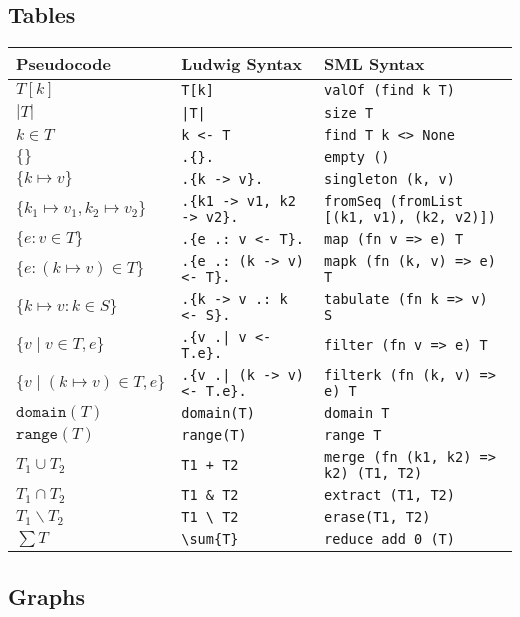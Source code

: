 \documentclass[11pt]{article}
\begin{document}
\subsection{Tables}

\begin{tabular}{| l l l |}
\hline
\textbf{Pseudocode} & \textbf{Ludwig Syntax} & \textbf{SML Syntax}\\
\hline
$T[k]$ & \verb"T[k]" & \verb"valOf (find k T)"\\
$|T|$ & \verb"|T|" & \verb"size T"\\
$k \in T$ & \verb"k <- T" & \verb"find T k <> None"\\
$\{\}$ & \verb".{}." & \verb"empty ()"\\
$\{k \mapsto v\}$ & \verb".{k -> v}." & \verb"singleton (k, v)"\\
$\{k_1 \mapsto v_1, k_2 \mapsto v_2\}$ & \verb".{k1 -> v1, k2 -> v2}." & \verb"fromSeq (fromList [(k1, v1), (k2, v2)])"\\
$\{e : v \in T\}$ & \verb".{e .: v <- T}." & \verb"map (fn v => e) T"\\
$\{e : (k \mapsto v) \in T\}$ & \verb".{e .: (k -> v) <- T}." & \verb"mapk (fn (k, v) => e) T"\\
$\{k \mapsto v : k \in S\}$ & \verb".{k -> v .: k <- S}." & \verb"tabulate (fn k => v) S"\\
$\{v \mid v \in T, e\}$ & \verb".{v .| v <- T.e}." & \verb"filter (fn v => e) T"\\
$\{v \mid (k \mapsto v) \in T, e\}$ & \verb".{v .| (k -> v) <- T.e}." & \verb"filterk (fn (k, v) => e) T"\\
$\texttt{domain}(T)$ & \verb"domain(T)" & \verb"domain T"\\
$\texttt{range}(T)$ & \verb"range(T)" & \verb"range T"\\
$T_1 \cup T_2$ & \verb"T1 + T2" & \verb"merge (fn (k1, k2) => k2) (T1, T2)"\\
$T_1 \cap T_2$ & \verb"T1 & T2" & \verb"extract (T1, T2)"\\
$T_1 \backslash T_2$ & \verb"T1 \ T2" & \verb"erase(T1, T2)"\\
$\displaystyle \sum{T}$ & \verb"\sum{T}" & \verb"reduce add 0 (T)"\\
\hline
\end{tabular}

\subsection{Graphs}
\end{document}
